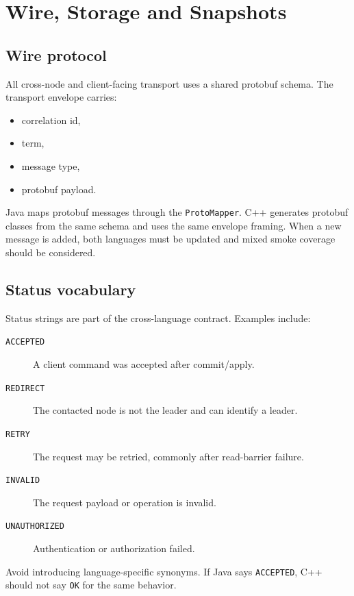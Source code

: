 \section{Wire, Storage and Snapshots}
\label{sec:WireStorageSnapshots}

\subsection{Wire protocol}

All cross-node and client-facing transport uses a shared protobuf schema. The
transport envelope carries:

\begin{itemize}
\item correlation id,
\item term,
\item message type,
\item protobuf payload.
\end{itemize}

Java maps protobuf messages through the \texttt{ProtoMapper}. C++ generates
protobuf classes from the same schema and uses the same envelope framing. When a
new message is added, both languages must be updated and mixed smoke coverage
should be considered.

\subsection{Status vocabulary}

Status strings are part of the cross-language contract. Examples include:

\begin{description}
\item[\texttt{ACCEPTED}] A client command was accepted after commit/apply.
\item[\texttt{REDIRECT}] The contacted node is not the leader and can identify a leader.
\item[\texttt{RETRY}] The request may be retried, commonly after read-barrier failure.
\item[\texttt{INVALID}] The request payload or operation is invalid.
\item[\texttt{UNAUTHORIZED}] Authentication or authorization failed.
\end{description}

Avoid introducing language-specific synonyms. If Java says \texttt{ACCEPTED},
C++ should not say \texttt{OK} for the same behavior.

